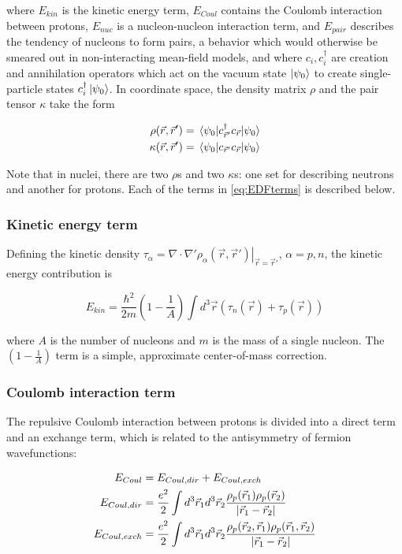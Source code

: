 \noindent where $E_{kin}$ is the kinetic energy term, $E_{Coul}$ contains the Coulomb interaction between protons, $E_{nuc}$ is a nucleon-nucleon interaction term, and $E_{pair}$ describes the tendency of nucleons to form pairs, a behavior which would otherwise be smeared out in non-interacting mean-field models, and where $c_i, c_i^\dagger$ are creation and annihilation operators which act on the vacuum state $\ket{\psi_0}$ to create single-particle states $c_i^\dagger\ket{\psi_0}$. In coordinate space, the density matrix $\rho$ and the pair tensor $\kappa$ take the form

\begin{align}
\rho(\vec{r},\vec{r}') &= \expval{c_{\vec{r}'}^\dagger c_{\vec{r}}}{\psi_0} \\
\kappa(\vec{r},\vec{r}') &= \expval{c_{\vec{r}'} c_{\vec{r}}}{\psi_0}
\end{align}

\noindent Note that in nuclei, there are two $\rho$s and two $\kappa$s: one set for describing neutrons and another for protons. Each of the terms in \ref{eq:EDFterms} is described below.

\subsubsection{Kinetic energy term}

Defining the kinetic density $\tau_\alpha = \left.\nabla\cdot\nabla'\rho_\alpha(\vec{r},\vec{r}')\right|_{\vec{r}=\vec{r}'}$, $\alpha=p,n$, the kinetic energy contribution is

\begin{equation}
E_{kin} = \frac{\hbar^2}{2m} \left(1-\frac{1}{A}\right) \int d^3\vec{r} \left(\tau_n(\vec{r}) + \tau_p(\vec{r}) \right)
\end{equation}

\noindent where $A$ is the number of nucleons and $m$ is the mass of a single nucleon. The $\left(1-\frac{1}{A}\right)$ term is a simple, approximate center-of-mass correction.

\subsubsection{Coulomb interaction term}
The repulsive Coulomb interaction between protons is divided into a direct term and an exchange term, which is related to the antisymmetry of fermion wavefunctions:

\begin{align}
E_{Coul} &= E_{Coul, dir} + E_{Coul, exch} \\
E_{Coul, dir}& = \frac{e^2}{2} \int d^3\vec{r}_1 d^3\vec{r}_2 \frac{\rho_p(\vec{r}_1)\rho_p(\vec{r}_2)}{\abs{\vec{r}_1-\vec{r}_2}} \\
E_{Coul, exch} &= \frac{e^2}{2} \int d^3\vec{r}_1 d^3\vec{r}_2 \frac{\rho_p(\vec{r}_2,\vec{r}_1)\rho_p(\vec{r}_1,\vec{r}_2)}{\abs{\vec{r}_1-\vec{r}_2}}
\end{align}

